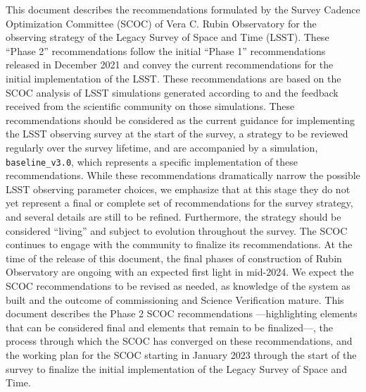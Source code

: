 
This document describes the recommendations formulated by the Survey Cadence Optimization Committee (SCOC) of Vera C. Rubin Observatory for the observing strategy of the Legacy Survey of Space and Time (LSST). These ``Phase 2'' recommendations follow the initial ``Phase 1'' recommendations released in December 2021  \citep[][2022]{PSTN-053} and convey the current recommendations for the initial implementation of the LSST. These recommendations are based on the SCOC analysis of LSST simulations generated according to  and the feedback received from the scientific community on those simulations. These recommendations should be considered as the current guidance for implementing the LSST observing survey at the start of the survey, a strategy to be reviewed regularly over the survey lifetime, and are accompanied by a simulation, \texttt{baseline\_v3.0}, which represents a specific implementation of these recommendations. While these recommendations dramatically narrow the possible LSST observing parameter choices, we emphasize that at this stage they do not yet represent a final or complete set of recommendations for the survey strategy, and several details are still to be refined. Furthermore, the strategy should be considered ``living'' and subject to evolution throughout the survey. The SCOC continues to engage with the community to finalize its recommendations. At the time of the release of this document, the final phases of construction of Rubin Observatory are ongoing with an expected first light in mid-2024. We expect the SCOC recommendations to be revised as needed, as knowledge of the system as built and the outcome of commissioning and Science Verification mature. This document describes the Phase 2 SCOC recommendations ---highlighting elements that can be considered final and elements that remain to be finalized---, the process through which the SCOC has converged on these recommendations, and the working plan for the SCOC starting in January 2023 through the start of the survey to finalize the initial implementation of the Legacy Survey of Space and Time.

